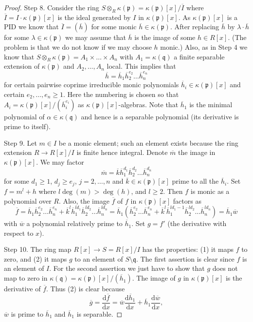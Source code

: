 \begin{proof}
\medskip\noindent
Step 8. Consider the ring
$S \otimes_R \kappa(\mathfrak p) = \kappa(\mathfrak p)[x]/\overline{I}$
where $\overline{I} = I \cdot \kappa(\mathfrak p)[x]$ is the ideal generated
by $I$ in $\kappa(\mathfrak p)[x]$. As $\kappa(\mathfrak p)[x]$ is a PID
we know that $\overline{I} = (\overline{h})$ for some monic
$\overline{h} \in \kappa(\mathfrak p)$. After replacing $\overline{h}$
by $\lambda \cdot \overline{h}$ for some $\lambda \in \kappa(\mathfrak p)$
we may assume that $\overline{h}$ is the image of some $h \in R[x]$.
(The problem is that we do not know if we may choose $h$ monic.)
Also, as in Step 4 we know that
$S \otimes_R \kappa(\mathfrak p) = A_1 \times \ldots \times A_n$ with
$A_1 = \kappa(\mathfrak q)$ a finite separable extension of
$\kappa(\mathfrak p)$ and $A_2, \ldots, A_n$ local. This implies
that
$$
\overline{h} = \overline{h}_1 \overline{h}_2^{e_2} \ldots \overline{h}_n^{e_n}
$$
for certain pairwise coprime irreducible monic polynomials
$\overline{h}_i \in \kappa(\mathfrak p)[x]$ and certain
$e_2, \ldots, e_n \geq 1$. Here the numbering is chosen so that
$A_i = \kappa(\mathfrak p)[x]/(\overline{h}_i^{e_i})$ as
$\kappa(\mathfrak p)[x]$-algebras. Note that $\overline{h}_1$ is
the minimal polynomial of $\alpha \in \kappa(\mathfrak q)$ and hence
is a separable polynomial (its derivative is prime to itself).

\medskip\noindent
Step 9. Let $m \in I$ be a monic element; such an element exists
because the ring extension $R \to R[x]/I$ is finite hence integral.
Denote $\overline{m}$ the image in $\kappa(\mathfrak p)[x]$.
We may factor
$$
\overline{m} = \overline{k}
\overline{h}_1^{d_1} \overline{h}_2^{d_2} \ldots \overline{h}_n^{d_n}
$$
for some $d_1 \geq 1$, $d_j \geq e_j$, $j = 2, \ldots, n$ and
$\overline{k} \in \kappa(\mathfrak p)[x]$ prime to all the $\overline{h}_i$.
Set $f = m^l + h$ where $l \deg(m) > \deg(h)$, and $l \geq 2$.
Then $f$ is monic as a polynomial over $R$. Also, the image $\overline{f}$
of $f$ in $\kappa(\mathfrak p)[x]$ factors as
$$
\overline{f} =
\overline{h}_1 \overline{h}_2^{e_2} \ldots \overline{h}_n^{e_n}
+
\overline{k}^l \overline{h}_1^{ld_1} \overline{h}_2^{ld_2}
\ldots \overline{h}_n^{ld_n}
=
\overline{h}_1(\overline{h}_2^{e_2} \ldots \overline{h}_n^{e_n}
+
\overline{k}^l
\overline{h}_1^{ld_1 - 1} \overline{h}_2^{ld_2} \ldots \overline{h}_n^{ld_n})
= \overline{h}_1 \overline{w}
$$
with $\overline{w}$ a polynomial relatively prime to $\overline{h}_1$.
Set $g = f'$ (the derivative with respect to $x$).

\medskip\noindent
Step 10. The ring map $R[x] \to S = R[x]/I$ has the properties:
(1) it maps $f$ to zero, and
(2) it maps $g$ to an element of $S \setminus \mathfrak q$.
The first assertion is clear since $f$ is an element of $I$.
For the second assertion we just have to show that $g$ does
not map to zero in
$\kappa(\mathfrak q) = \kappa(\mathfrak p)[x]/(\overline{h}_1)$.
The image of $g$ in $\kappa(\mathfrak p)[x]$ is the derivative
of $\overline{f}$. Thus (2) is clear because
$$
\overline{g} =
\frac{\text{d}\overline{f}}{\text{d}x} =
\overline{w}\frac{\text{d}\overline{h}_1}{\text{d}x} +
\overline{h}_1\frac{\text{d}\overline{w}}{\text{d}x},
$$
$\overline{w}$ is prime to $\overline{h}_1$ and
$\overline{h}_1$ is separable.


\end{proof}
